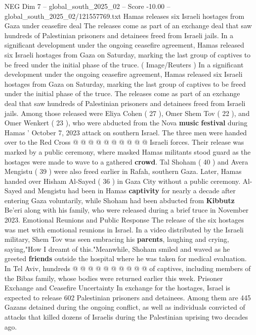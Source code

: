 \begin{textsample}{NEG Dim 7 – global\_south\_2025\_02 – Score -10.00 – global\_south\_2025\_02/121557769.txt}  \label{ex:f7_neg_262}
Hamas releases six Israeli hostages from Gaza under ceasefire deal The releases come as part of an exchange deal that saw hundreds of Palestinian prisoners and detainees freed from Israeli jails.
In a significant development under the ongoing ceasefire agreement, Hamas released six Israeli hostages from Gaza on Saturday, marking the last group of captives to be freed under the initial phase of the truce. ( Image/Reuters ) In a significant development under the ongoing ceasefire agreement, Hamas released six Israeli hostages from Gaza on Saturday, marking the last group of captives to be freed under the initial phase of the truce.
The releases come as part of an exchange deal that saw hundreds of Palestinian prisoners and detainees freed from Israeli jails.
Among those released were Eliya Cohen ( 27 ), Omer Shem Tov ( 22 ), and Omer Wenkert ( 23 ), who were abducted from the Nova \textbf{music} \textbf{festival} during Hamas ' October 7, 2023 attack on southern Israel.
The three men were handed over to the Red Cross @ @ @ @ @ @ @ @ @ @ Israeli forces.
Their release was marked by a public ceremony, where masked Hamas militants stood guard as the hostages were made to wave to a gathered \textbf{crowd}.
Tal Shoham ( 40 ) and Avera Mengistu ( 39 ) were also freed earlier in Rafah, southern Gaza.
Later, Hamas handed over Hisham Al-Sayed ( 36 ) in Gaza City without a public ceremony.
Al-Sayed and Mengistu had been in Hamas \textbf{captivity} for nearly a decade after entering Gaza voluntarily, while Shoham had been abducted from \textbf{Kibbutz} Be'eri along with his family, who were released during a brief truce in November 2023.
Emotional Reunions and Public Response The release of the six hostages was met with emotional reunions in Israel.
In a video distributed by the Israeli military, Shem Tov was seen embracing his \textbf{parents}, laughing and crying, saying,"How I dreamt of this."Meanwhile, Shoham smiled and waved as he greeted \textbf{friends} outside the hospital where he was taken for medical evaluation.
In Tel Aviv, hundreds @ @ @ @ @ @ @ @ @ @ of captives, including members of the Bibas family, whose bodies were returned earlier this week.
Prisoner Exchange and Ceasefire Uncertainty In exchange for the hostages, Israel is expected to release 602 Palestinian prisoners and detainees.
Among them are 445 Gazans detained during the ongoing conflict, as well as individuals convicted of attacks that killed dozens of Israelis during the Palestinian uprising two decades ago.

\end{textsample}
